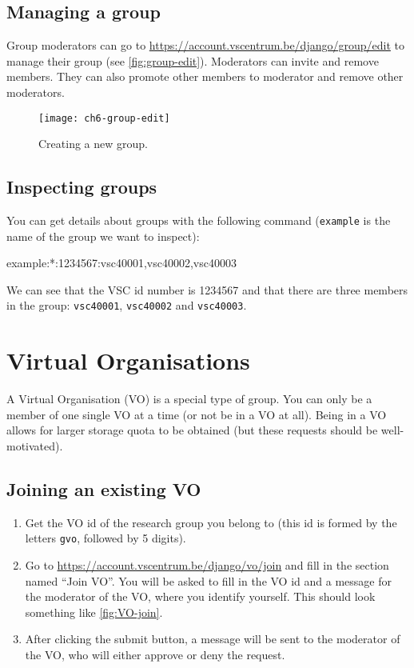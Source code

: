 \subsection{Managing a group}

Group moderators can go to \url{https://account.vscentrum.be/django/group/edit} to
manage their group (see \autoref{fig:group-edit}). Moderators can invite and remove members. They can also promote
other members to moderator and remove other moderators.

\begin{figure}[!htbp]
  \caption{Creating a new group.}
  \centering
    \texttt{[image: ch6-group-edit]}
\end{figure}\label{fig:group-edit}

\subsection{Inspecting groups}

You can get details about groups with the following command (\lstinline|example|
is the name of the group we want to inspect):

\begin{prompt}
example:*:1234567:vsc40001,vsc40002,vsc40003
\end{prompt}

We can see that the VSC id number is 1234567 and that there are three members in
the group: \lstinline|vsc40001|, \lstinline|vsc40002| and \lstinline|vsc40003|.

\ifgent
\section{Virtual Organisations}
\label{sec:virtual-organisations}

A Virtual Organisation (VO) is a special type of group. You can only be a member
of one single VO at a time (or not be in a VO at all).
Being in a VO allows for larger storage quota to be obtained
(but these requests should be well-motivated).

\subsection{Joining an existing VO}

\begin{enumerate}
    \item Get the VO id of the research group you belong to (this id is formed by
        the letters \lstinline|gvo|, followed by 5 digits).
    \item Go to \url{https://account.vscentrum.be/django/vo/join} and fill in the
        section named ``Join VO''. You will be asked to fill in the VO id and a message for
        the moderator of the VO, where you identify yourself. This should look something
        like \autoref{fig:VO-join}.
    \item After clicking the submit button, a message will be sent to the moderator
    of the VO, who will either approve or deny the request.
\end{enumerate}



